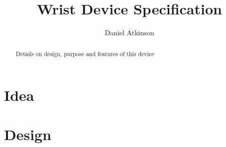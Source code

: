 \documentclass{article}
\begin{document}
\title{Wrist Device Specification}

\author{Daniel Atkinson}

\maketitle

\begin{abstract}

Details on design, purpose and features of this device

\end{abstract}


\section{Idea}


\section{Design}



\end{document}
